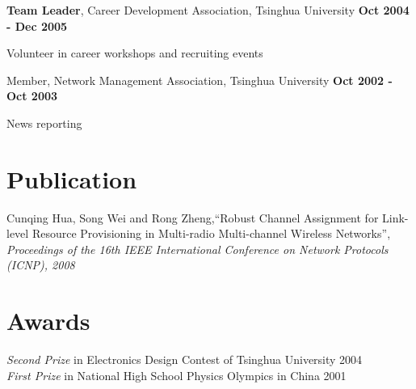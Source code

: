 \documentclass[overlapped, line]{resume}
\begin{document}
\begin{resume}
         {\bf Team Leader}, Career Development Association, Tsinghua University \hfill {\bf Oct 2004 -  Dec 2005}\\
         \vspace{-10pt}      %
         \begin{list2}
         \item Volunteer in career workshops and recruiting events
         \end{list2}  \vspace{-5pt}

         Member, Network Management Association, Tsinghua University \hfill {\bf Oct 2002 -  Oct 2003}\\
         \vspace{-10pt}      %
         \begin{list2}
         \item News reporting
         \end{list2}  \vspace{-5pt}

         \vspace{-15pt}\section{Publication}

         Cunqing Hua, Song Wei and Rong Zheng,``Robust Channel Assignment for Link-level Resource Provisioning in Multi-radio Multi-channel Wireless Networks'', \textsl{Proceedings of the 16th IEEE International Conference on Network Protocols (ICNP), 2008} 


         \vspace{-22pt}\section{Awards}
         \textsl{Second Prize} in Electronics Design Contest of Tsinghua University \hfill 2004\\
         \textsl{First Prize} in National High School Physics Olympics in China \hfill 2001

\end{resume}
\end{document}
